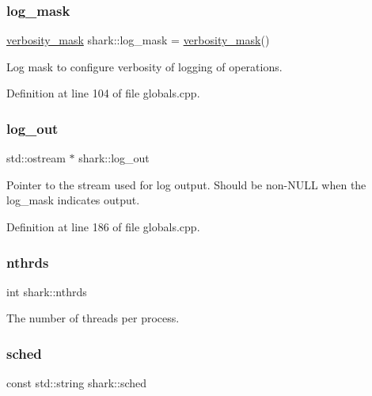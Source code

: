 \hypertarget{namespaceshark_a110e03e8104b06caef346fcc25621aa9}{}\label{namespaceshark_a110e03e8104b06caef346fcc25621aa9} 
\subsubsection{\texorpdfstring{log\+\_\+mask}{log\_mask}}
{\footnotesize\ttfamily \hyperlink{namespaceshark_a882c3e22f3e4476cf4a95f34a42e27eb}{verbosity\+\_\+mask} shark\+::log\+\_\+mask = \hyperlink{namespaceshark_a882c3e22f3e4476cf4a95f34a42e27eb}{verbosity\+\_\+mask}()}

Log mask to configure verbosity of logging of operations. 

Definition at line 104 of file globals.\+cpp.

\hypertarget{namespaceshark_a503a509b9d2d2710abe48d6c3338abc0}{}\label{namespaceshark_a503a509b9d2d2710abe48d6c3338abc0} 
\subsubsection{\texorpdfstring{log\+\_\+out}{log\_out}}
{\footnotesize\ttfamily std\+::ostream $\ast$ shark\+::log\+\_\+out}

Pointer to the stream used for log output. Should be non-\/\+N\+U\+LL when the log\+\_\+mask indicates output. 

Definition at line 186 of file globals.\+cpp.

\hypertarget{namespaceshark_a4912c1d983c9655b4ed992ac1f99530f}{}\label{namespaceshark_a4912c1d983c9655b4ed992ac1f99530f} 
\subsubsection{\texorpdfstring{nthrds}{nthrds}}
{\footnotesize\ttfamily int shark\+::nthrds}

The number of threads per process. \hypertarget{namespaceshark_ae92376c2b8a35cd983f3f7eea9ab959b}{}\label{namespaceshark_ae92376c2b8a35cd983f3f7eea9ab959b} 
\subsubsection{\texorpdfstring{sched}{sched}}
{\footnotesize\ttfamily const std\+::string shark\+::sched}

